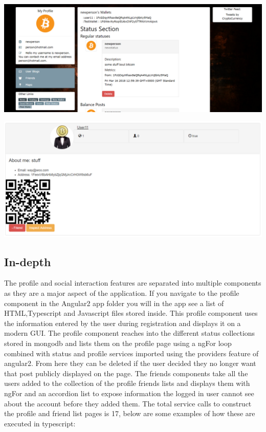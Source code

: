 \includegraphics[]{img/UserProfile.png}

\includegraphics[]{img/Friendslist.png}

\subsection{In-depth}
The profile and social interaction features are separated into multiple components as they are a major aspect of the application. If you navigate to the profile component in the Angular2 app folder you will  in the app see a list of HTML,Typescript and Javascript files stored inside. This profile component uses the information entered by the user during registration and displays it on a modern GUI. The profile component reaches into the different status collections stored in mongodb and lists them on the profile page using a ngFor loop combined with status and profile services imported using the providers feature of angular2. From here they can be deleted if the user decided they no longer want that post publicly displayed on the page. The friends components take all the users added to the collection of the profile friends lists and displays them with ngFor and an accordion list to expose information the logged in user cannot see about the account before they added them. The total service calls to construct the profile and friend list pages is 17, below are some examples of how these are executed in typescript:

